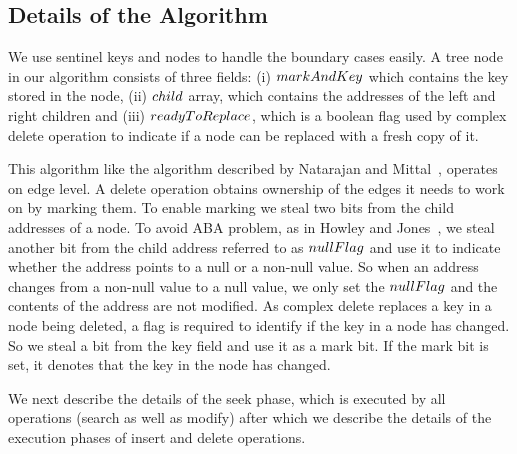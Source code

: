 

\subsection{Details of the Algorithm}
We use sentinel keys and nodes to handle the boundary cases easily. A tree node in our algorithm consists of three fields: (i) $markAndKey$ which contains the key stored in the node, (ii) $child$ array, which contains the addresses of the left and right children and (iii) $readyToReplace$, which is a boolean flag used by complex delete operation to indicate if a node can be replaced with a fresh copy of it. \par
This algorithm like the algorithm described by Natarajan and Mittal~\cite{Natarajan:2014:PPOPP}, operates on edge level. A delete operation obtains ownership of the edges it needs to work on by marking them. To enable marking we steal two bits from the child addresses of a node. To avoid ABA problem, as in Howley and Jones~\cite{HowJon:2012:SPAA}, we steal another bit from the child address referred to as $nullFlag$ and use it to indicate whether the address points to a null or a non-null value. So when an address changes from a non-null value to a null value, we only set the $nullFlag$ and the contents of the address are not modified. As complex delete replaces a key in a node being deleted, a flag is required to identify if the key in a node has changed. So we steal a bit from the key field and use it as a mark bit. If the mark bit is set, it denotes that the key in the node has changed.

We next describe the details of the seek phase, which is executed by all operations (search as well as modify) after which we describe the details of the execution phases of insert and delete operations.


